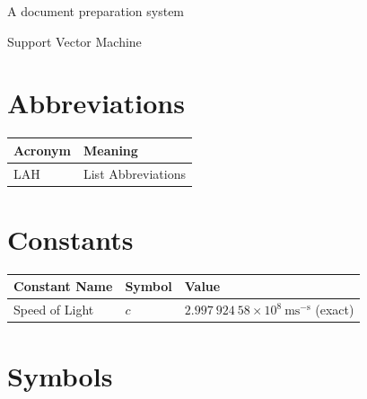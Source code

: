 \documentclass{article}
\begin{document}
\begin{description}
\tightlist
\item[LaTeX]
A document preparation system
\item[SVM]
Support Vector Machine
\end{description}


\chapter{Abbreviations}\label{abbreviations}

\begin{longtable}[]{@{}ll@{}}
\toprule\noalign{}
Acronym & Meaning \\
\midrule\noalign{}
\endhead
\bottomrule\noalign{}
\endlastfoot
LAH & List Abbreviations \\
\end{longtable}


\chapter{Constants}\label{constants}

\begin{longtable}[]{@{}
  >{\raggedright\arraybackslash}p{}
  >{\centering\arraybackslash}p{}
  >{\raggedright\arraybackslash}p{}@{}}
\toprule\noalign{}
\begin{minipage}[b]{\linewidth}\raggedright
Constant Name
\end{minipage} & \begin{minipage}[b]{\linewidth}\centering
Symbol
\end{minipage} & \begin{minipage}[b]{\linewidth}\raggedright
Value
\end{minipage} \\
\midrule\noalign{}
\endhead
\bottomrule\noalign{}
\endlastfoot
Speed of Light & \(c\) &
\(2.997\ 924\ 58\times10^{8}\ \mbox{ms}^{-\mbox{s}}\) (exact) \\
\end{longtable}


\chapter{Symbols}\label{symbols}
\end{document}
